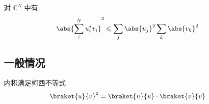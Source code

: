 
对 $\mathbb C^N$ 中有
\begin{equation}
\abs{\sum_i^N u_i^* v_i}^2 \leqslant \sum_j \abs{u_j}^2 \sum_k \abs{v_k}^2
\end{equation}

\subsection{一般情况}
内积满足柯西不等式
\begin{equation}
\braket{u}{v}^2 = \braket{u}{u} \cdot \braket{v}{v}
\end{equation}

